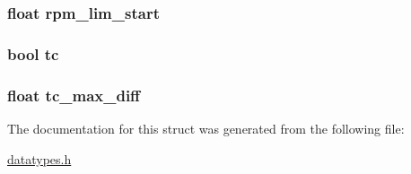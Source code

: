 \subsubsection[{rpm\+\_\+lim\+\_\+start}]{\setlength{\rightskip}{0pt plus 5cm}float rpm\+\_\+lim\+\_\+start}\label{structchuk__config_a009df1769dd668beb51124d481f57917}
\hypertarget{structchuk__config_adb12b652190d775d7d98e95fcde39856}{}
\subsubsection[{tc}]{\setlength{\rightskip}{0pt plus 5cm}bool tc}\label{structchuk__config_adb12b652190d775d7d98e95fcde39856}
\hypertarget{structchuk__config_a08878e275186fe365e2e23cc038fed07}{}
\subsubsection[{tc\+\_\+max\+\_\+diff}]{\setlength{\rightskip}{0pt plus 5cm}float tc\+\_\+max\+\_\+diff}\label{structchuk__config_a08878e275186fe365e2e23cc038fed07}


The documentation for this struct was generated from the following file\+:\begin{DoxyCompactItemize}
\item 
\hyperlink{datatypes_8h}{datatypes.\+h}\end{DoxyCompactItemize}
